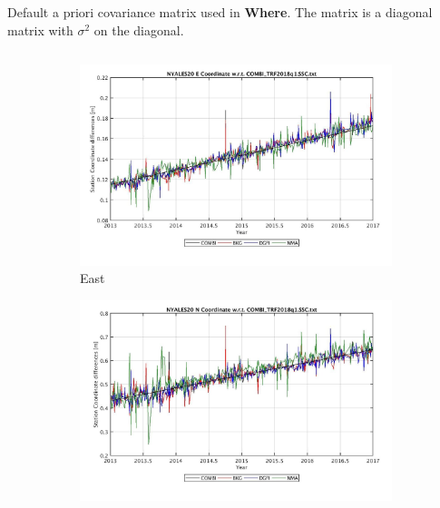 \documentclass{beamer}
\begin{document}
\begin{frame}[t]
\begin{columns}
\begin{column}[t]{.24\textwidth}
      \vspace*{2cm}     %
       \begin{table}
         
         \caption{Default a priori covariance matrix used in \textbf{Where}. The matrix is a diagonal matrix with
         $\sigma^2$ on the diagonal.}
         \label{tbl:sigmas}
       \end{table}

     \end{column}
   \end{columns}


  \vspace*{1cm}
  \begin{columns}
    \begin{column}[t]{\textwidth}
     \begin{figure}
      \begin{subfigure}{0.33\textwidth}
        \includegraphics[width=\linewidth]{figure/NYALES20-E_diff-trf}
        \caption{East}
        \label{fig:nyal_e}
      \end{subfigure}
      \begin{subfigure}{0.33\textwidth}
        \includegraphics[width=\linewidth]{figure/NYALES20-N_diff-trf}

\end{subfigure}
\end{figure}
\end{column}
\end{columns}
\end{frame}
\end{document}
